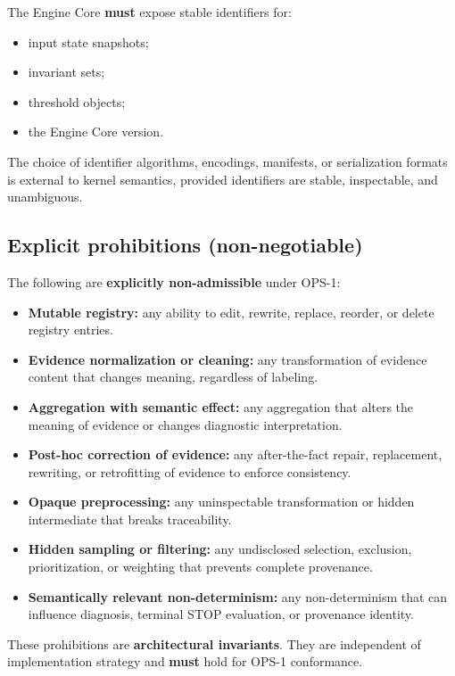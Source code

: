 The Engine Core \textbf{must} expose stable identifiers for:
\begin{itemize}
  \item input state snapshots;
  \item invariant sets;
  \item threshold objects;
  \item the Engine Core version.
\end{itemize}

The choice of identifier algorithms,
encodings, manifests,
or serialization formats is external
to kernel semantics,
provided identifiers are stable,
inspectable, and unambiguous.

\subsection{Explicit prohibitions (non-negotiable)}

The following are \textbf{explicitly non-admissible}
under OPS-1:
\begin{itemize}
  \item \textbf{Mutable registry:}
        any ability to edit, rewrite, replace,
        reorder, or delete registry entries.
  \item \textbf{Evidence normalization or cleaning:}
        any transformation of evidence content
        that changes meaning,
        regardless of labeling.
  \item \textbf{Aggregation with semantic effect:}
        any aggregation that alters the meaning
        of evidence or changes diagnostic interpretation.
  \item \textbf{Post-hoc correction of evidence:}
        any after-the-fact repair, replacement,
        rewriting, or retrofitting of evidence
        to enforce consistency.
  \item \textbf{Opaque preprocessing:}
        any uninspectable transformation or
        hidden intermediate that breaks traceability.
  \item \textbf{Hidden sampling or filtering:}
        any undisclosed selection, exclusion,
        prioritization, or weighting that prevents
        complete provenance.
  \item \textbf{Semantically relevant non-determinism:}
        any non-determinism that can influence
        diagnosis, terminal STOP evaluation,
        or provenance identity.
\end{itemize}

These prohibitions are \textbf{architectural invariants}.
They are independent of implementation strategy
and \textbf{must} hold for OPS-1 conformance.
